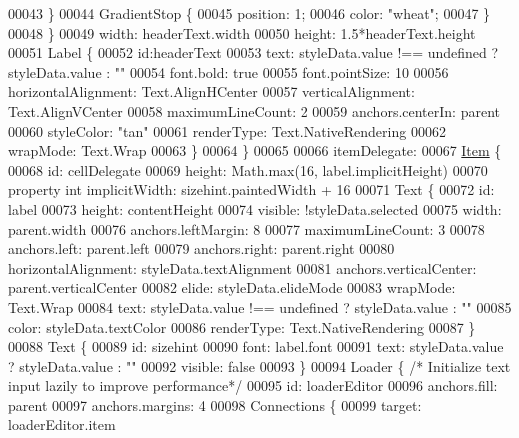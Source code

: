 \begin{DoxyCode}
00043             \}
00044             GradientStop \{
00045                 position: 1;
00046                 color: \textcolor{stringliteral}{"wheat"};
00047             \}
00048         \}
00049         width: headerText.width
00050         height: 1.5*headerText.height
00051         Label \{
00052             \textcolor{keywordtype}{id}:headerText
00053             text: styleData.value !== undefined ? styleData.value : \textcolor{stringliteral}{""}
00054             font.bold: \textcolor{keyword}{true}
00055             font.pointSize: 10
00056             horizontalAlignment: Text.AlignHCenter
00057             verticalAlignment: Text.AlignVCenter
00058             maximumLineCount: 2
00059             anchors.centerIn: parent
00060             styleColor: \textcolor{stringliteral}{"tan"}
00061             renderType: Text.NativeRendering
00062             wrapMode: Text.Wrap
00063         \}
00064     \}
00065 
00066     itemDelegate:
00067         \hyperlink{classItem}{Item} \{
00068         \textcolor{keywordtype}{id}: cellDelegate
00069         height: Math.max(16, label.implicitHeight)
00070         \textcolor{keyword}{property} \textcolor{keywordtype}{int} implicitWidth: sizehint.paintedWidth + 16
00071         Text \{
00072             \textcolor{keywordtype}{id}: label
00073             height: contentHeight
00074             visible: !styleData.selected
00075             width: parent.width
00076             anchors.leftMargin: 8
00077             maximumLineCount: 3
00078             anchors.left: parent.left
00079             anchors.right: parent.right
00080             horizontalAlignment: styleData.textAlignment
00081             anchors.verticalCenter: parent.verticalCenter
00082             elide: styleData.elideMode
00083             wrapMode: Text.Wrap
00084             text: styleData.value !== undefined ? styleData.value : \textcolor{stringliteral}{""}
00085             color: styleData.textColor
00086             renderType: Text.NativeRendering
00087         \}
00088         Text \{
00089             \textcolor{keywordtype}{id}: sizehint
00090             font: label.font
00091             text: styleData.value ? styleData.value : \textcolor{stringliteral}{""}
00092             visible: \textcolor{keyword}{false}
00093         \}
00094         Loader \{ \textcolor{comment}{/* Initialize text input lazily to improve performance*/}
00095             \textcolor{keywordtype}{id}: loaderEditor
00096             anchors.fill: parent
00097             anchors.margins: 4
00098             Connections \{
00099                 target: loaderEditor.item

\end{DoxyCode}
